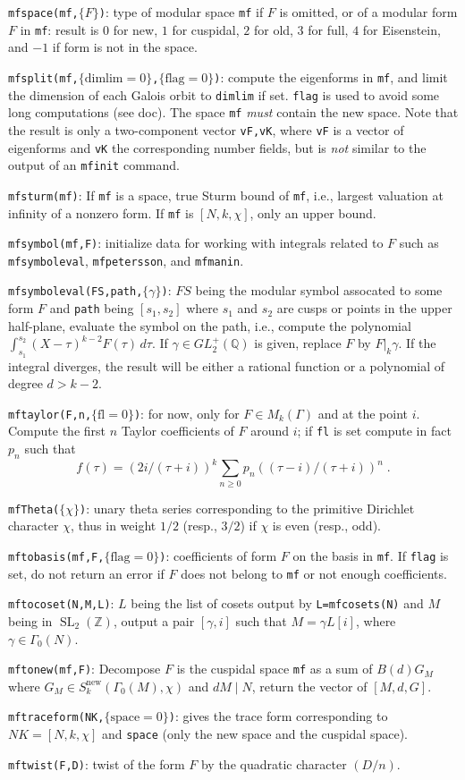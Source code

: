 \documentclass[11pt]{article}
\DeclareMathOperator{\SL}{SL}
\newcommand{\Q}{{\mathbb Q}}
\newcommand{\Z}{{\mathbb Z}}
\newcommand{\ga}{\gamma}
\newcommand{\G}{\Gamma}
\newcommand{\new}{\text{new}}
\def\kbd#1{{\tt #1}}
\begin{document}
\f\kbd{mfspace(mf,$\{F\}$)}: type of modular space \kbd{mf} if $F$ is omitted,
or of a modular form $F$ in \kbd{mf}: result is $0$ for new, $1$ for cuspidal,
$2$ for old, $3$ for full, $4$ for Eisenstein, and $-1$ if form is not in
the space.

\f\kbd{mfsplit(mf,$\{\text{dimlim}=0\}$,$\{\text{flag}=0\}$)}: compute the
eigenforms in \kbd{mf}, and limit the dimension of each Galois orbit to
\kbd{dimlim} if set. \kbd{flag} is used to avoid some long computations (see
doc). The space \kbd{mf} \emph{must} contain the new space. Note that the
result is only a two-component vector \kbd{vF,vK}, where \kbd{vF} is a vector
of eigenforms and \kbd{vK} the corresponding number fields, but is \emph{not}
similar to the output of an \kbd{mfinit} command.

\f\kbd{mfsturm(mf)}: If \kbd{mf} is a space, true Sturm bound of \kbd{mf}, i.e.,
largest valuation at infinity of a nonzero form. If \kbd{mf} is $[N,k,\chi]$,
only an upper bound.

\f\kbd{mfsymbol(mf,F)}: initialize data for working with integrals related
to $F$ such as \kbd{mfsymboleval}, \kbd{mfpetersson}, and \kbd{mfmanin}.

\f\kbd{mfsymboleval(FS,path,$\{\ga\}$)}: $FS$ being the modular symbol
assocated to some form $F$ and \kbd{path} being $[s_1,s_2]$ where $s_1$ and
$s_2$ are cusps or points in the upper half-plane, evaluate the symbol on the
path, i.e., compute the polynomial
$\int_{s_1}^{s_2}(X-\tau)^{k-2}F(\tau)\,d\tau$. If $\ga\in GL_2^+(\Q)$ is
given, replace $F$ by $F|_k\ga$. If the integral diverges, the result will be
either a rational function or a polynomial of degree $d>k-2$.

\f\kbd{mftaylor(F,n,$\{\text{fl}=0\}$)}: for now, only for $F\in M_k(\G)$ and
at the point $i$. Compute the first $n$ Taylor coefficients of $F$ around
$i$; if \kbd{fl} is set compute in fact $p_n$ such that
$$f(\tau)=(2i/(\tau+i))^k\sum_{n\ge0}p_n((\tau-i)/(\tau+i))^n\;.$$

\f\kbd{mfTheta($\{\chi\}$)}: unary theta series corresponding to the primitive
Dirichlet character $\chi$, thus in weight $1/2$ (resp., $3/2$)
if $\chi$ is even (resp., odd).

\f\kbd{mftobasis(mf,F,$\{\text{flag}=0\}$)}: coefficients of form $F$ on the
basis in \kbd{mf}. If \kbd{flag} is set, do not return an error if $F$ does
not belong to \kbd{mf} or not enough coefficients.

\f\kbd{mftocoset(N,M,L)}: $L$ being the list of cosets output by
\kbd{L=mfcosets(N)} and $M$ being in $\SL_2(\Z)$, output a pair
$[\ga,i]$ such that $M=\ga L[i]$, where $\ga\in \G_0(N)$.

\f\kbd{mftonew(mf,F)}: Decompose $F$ is the cuspidal space \kbd{mf} as
a sum of $B(d)G_M$ where $G_M\in S_k^{\new}(\G_0(M),\chi)$ and $dM\mid N$,
return the vector of $[M,d,G]$.

\f\kbd{mftraceform(NK,$\{\text{space}=0\}$)}: gives the trace form
corresponding to $NK=[N,k,\chi]$ and \kbd{space} (only the new space and the
cuspidal space).

\f\kbd{mftwist(F,D)}: twist of the form $F$ by the quadratic character
$(D/n)$.
\end{document}
